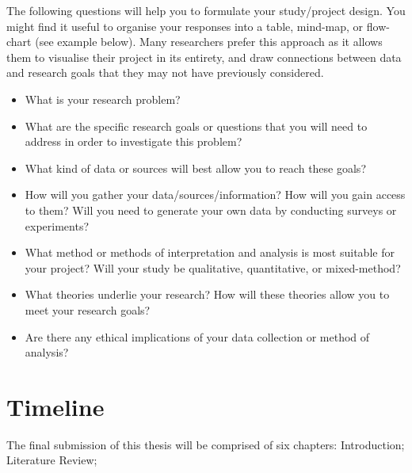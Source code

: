 \documentclass[12pt, a4paper]{article}
\begin{document}
The following questions will help you to formulate your study/project design. You might find it useful to organise your responses into a table, mind-map, or flow-chart (see example below). Many researchers prefer this approach as it allows them to visualise their project in its entirety, and draw connections between data and research goals that they may not have previously considered.
\begin{itemize}
\item What is your research problem?
\item What are the specific research goals or questions that you will need to address in order to investigate this problem?
\item What kind of data or sources will best allow you to reach these goals?
\item How will you gather your data/sources/information? How will you gain access to them? Will you need to generate your own data by conducting surveys or experiments?
\item What method or methods of interpretation and analysis is most suitable for your project? Will your study be qualitative, quantitative, or mixed-method?
\item What theories underlie your research? How will these theories allow you to meet your research goals?
\item Are there any ethical implications of your data collection or method of analysis?
\end{itemize}


\section{Timeline}

The final submission of this thesis will be comprised of six chapters: Introduction; Literature Review; 

\clearpage
\end{document}
